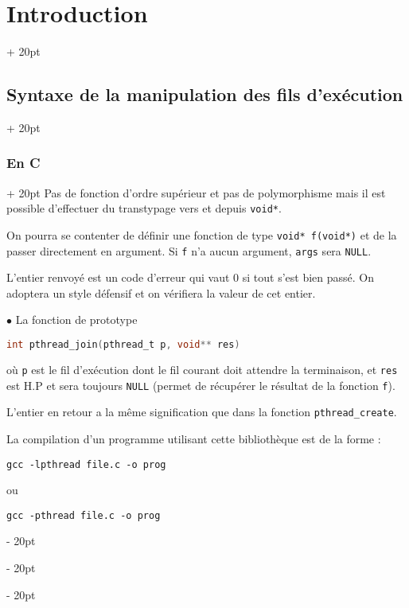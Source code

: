 \documentclass[a4paper, 12pt, twoside]{article}
\newcommand{\ind}[1][20pt]{\advance\leftskip + #1}
\newcommand{\deind}[1][20pt]{\advance\leftskip - #1}
\newenvironment{indt}[2][20pt]{#2 \par \ind[#1]}{\par \deind} %
\begin{document}
\begin{indt}{\section{Introduction}}
\begin{indt}{\subsection{Syntaxe de la manipulation des fils d'exécution}}
\begin{indt}{\subsubsection{En C}}
                Pas de fonction d'ordre supérieur et pas de polymorphisme mais il est possible d'effectuer du transtypage vers et depuis \texttt{void*}.

                On pourra se contenter de définir une fonction de type \texttt{void* f(void*)} et de la passer directement en argument.
                Si \texttt f n'a aucun argument, \texttt{args} sera \texttt{NULL}.

                L'entier renvoyé est un code d'erreur qui vaut 0 si tout s'est bien passé. On adoptera un style défensif et on vérifiera la valeur de cet entier.

                \vspace{12pt}
                
                $\bullet$ La fonction de prototype

                \begin{lstlisting}[language=C, xleftmargin=80pt]
int pthread_join(pthread_t p, void** res)\end{lstlisting}

                où \texttt p est le fil d'exécution dont le fil courant doit attendre la terminaison, et \texttt{res} est H.P et sera toujours \texttt{NULL} (permet de récupérer le résultat de la fonction \texttt f).

                L'entier en retour a la même signification que dans la fonction \texttt{pthread\_create}.

                \vspace{12pt}
                
                La compilation d'un programme utilisant cette bibliothèque est de la forme :

                \begin{center}
                    \texttt{gcc -lpthread file.c -o prog}
                \end{center}

                ou
                \begin{center}
                    \texttt{gcc -pthread file.c -o prog}
                \end{center}
            \end{indt}
        \end{indt}
    \end{indt}

    \vspace{12pt}
    
\end{document}
